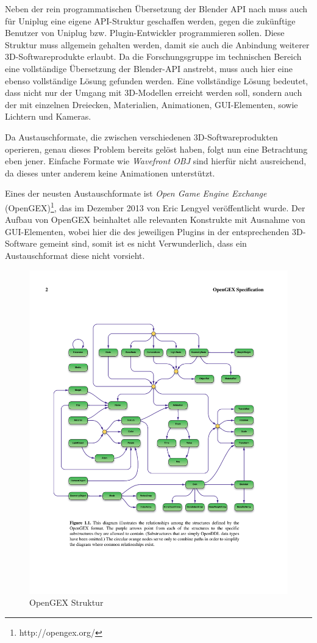  \label{sec:logi}

Neben der rein programmatischen Übersetzung der Blender API nach \CS muss auch für Uniplug eine eigene API-Struktur geschaffen werden, gegen die zukünftige Benutzer von Uniplug bzw. Plugin-Entwickler programmieren sollen. Diese Struktur muss allgemein gehalten werden, damit sie auch die Anbindung weiterer 3D-Softwareprodukte erlaubt. Da die Forschungsgruppe im technischen Bereich eine vollständige Übersetzung der Blender-API anstrebt, muss auch hier eine ebenso vollständige Lösung gefunden werden. Eine vollständige Lösung bedeutet, dass nicht nur der Umgang mit 3D-Modellen erreicht werden soll, sondern auch der mit einzelnen Dreiecken, Materialien, Animationen, GUI-Elementen, sowie Lichtern und Kameras.

Da Austauschformate, die zwischen verschiedenen 3D-Softwareprodukten operieren, genau dieses Problem bereits gelöst haben, folgt nun eine Betrachtung eben jener. Einfache Formate wie \emph{Wavefront OBJ} sind hierfür nicht ausreichend, da dieses unter anderem keine Animationen unterstützt.

Eines der neusten Austauschformate ist \emph{Open Game Engine Exchange} (OpenGEX)\footnote{http://opengex.org/}, das im Dezember 2013 von Eric Lengyel veröffentlicht wurde. Der Aufbau von OpenGEX beinhaltet alle relevanten Konstrukte mit Ausnahme von GUI-Elementen, wobei hier die des jeweiligen Plugins in der entsprechenden 3D-Software gemeint sind, somit ist es nicht Verwunderlich, dass ein Austauschformat diese nicht vorsieht.

\begin{figure}[htbp]
\center
\includegraphics[width=1\textwidth]{images/opengexstruktur}
\caption{OpenGEX Struktur}
\label{fig:opengexstruktur}
\end{figure}